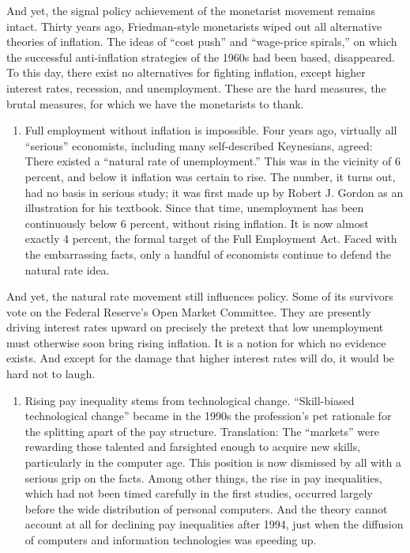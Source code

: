 \documentclass[
]{book}
\providecommand{\tightlist}{%
  \setlength{\itemsep}{0pt}\setlength{\parskip}{0pt}}
\begin{document}
And yet, the signal policy achievement of the monetarist movement remains intact. Thirty years ago, Friedman-style monetarists wiped out all alternative theories of inflation. The ideas of ``cost push'' and ``wage-price spirals,'' on which the successful anti-inflation strategies of the 1960s had been based, disappeared. To this day, there exist no alternatives for fighting inflation, except higher interest rates, recession, and unemployment. These are the hard measures, the brutal measures, for which we have the monetarists to thank.

\begin{enumerate}
\def\labelenumi{\arabic{enumi}.}
\setcounter{enumi}{1}
\tightlist
\item
  Full employment without inflation is impossible. Four years ago, virtually all ``serious'' economists, including many self-described Keynesians, agreed: There existed a ``natural rate of unemployment.'' This was in the vicinity of 6 percent, and below it inflation was certain to rise. The number, it turns out, had no basis in serious study; it was first made up by Robert J. Gordon as an illustration for his textbook. Since that time, unemployment has been continuously below 6 percent, without rising inflation. It is now almost exactly 4 percent, the formal target of the Full Employment Act. Faced with the embarrassing facts, only a handful of economists continue to defend the natural rate idea.
\end{enumerate}

And yet, the natural rate movement still influences policy. Some of its survivors vote on the Federal Reserve's Open Market Committee. They are presently driving interest rates upward on precisely the pretext that low unemployment must otherwise soon bring rising inflation. It is a notion for which no evidence exists. And except for the damage that higher interest rates will do, it would be hard not to laugh.

\begin{enumerate}
\def\labelenumi{\arabic{enumi}.}
\setcounter{enumi}{2}
\tightlist
\item
  Rising pay inequality stems from technological change. ``Skill-biased technological change'' became in the 1990s the profession's pet rationale for the splitting apart of the pay structure. Translation: The ``markets'' were rewarding those talented and farsighted enough to acquire new skills, particularly in the computer age. This position is now dismissed by all with a serious grip on the facts. Among other things, the rise in pay inequalities, which had not been timed carefully in the first studies, occurred largely before the wide distribution of personal computers. And the theory cannot account at all for declining pay inequalities after 1994, just when the diffusion of computers and information technologies was speeding up.
\end{enumerate}
\end{document}
